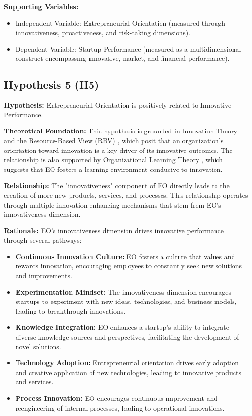 \documentclass[../Main.tex]{subfiles}
\begin{document}
    \textbf{Supporting Variables:}
    \begin{itemize}
        \item Independent Variable: Entrepreneurial Orientation (measured through innovativeness, proactiveness, and risk-taking dimensions).
        \item Dependent Variable: Startup Performance (measured as a multidimensional construct encompassing innovative, market, and financial performance).
    \end{itemize}

    \subsection{Hypothesis 5 (H5)}
    \textbf{Hypothesis:} Entrepreneurial Orientation is positively related to Innovative Performance.
    
    \textbf{Theoretical Foundation:} This hypothesis is grounded in Innovation Theory \cite{schumpeter1934theory} and the Resource-Based View (RBV) \cite{barney1991firm}, which posit that an organization's orientation toward innovation is a key driver of its innovative outcomes. The relationship is also supported by Organizational Learning Theory \cite{argyris1978organizational}, which suggests that EO fosters a learning environment conducive to innovation.
    
    \textbf{Relationship:} The "innovativeness" component of EO directly leads to the creation of more new products, services, and processes. This relationship operates through multiple innovation-enhancing mechanisms that stem from EO's innovativeness dimension.
    
    \textbf{Rationale:} EO's innovativeness dimension drives innovative performance through several pathways:
    \begin{itemize}
        \item \textbf{Continuous Innovation Culture:} EO fosters a culture that values and rewards innovation, encouraging employees to constantly seek new solutions and improvements.
        \item \textbf{Experimentation Mindset:} The innovativeness dimension encourages startups to experiment with new ideas, technologies, and business models, leading to breakthrough innovations.
        \item \textbf{Knowledge Integration:} EO enhances a startup's ability to integrate diverse knowledge sources and perspectives, facilitating the development of novel solutions.
        \item \textbf{Technology Adoption:} Entrepreneurial orientation drives early adoption and creative application of new technologies, leading to innovative products and services.
        \item \textbf{Process Innovation:} EO encourages continuous improvement and reengineering of internal processes, leading to operational innovations.
    \end{itemize}
    
\end{document}
